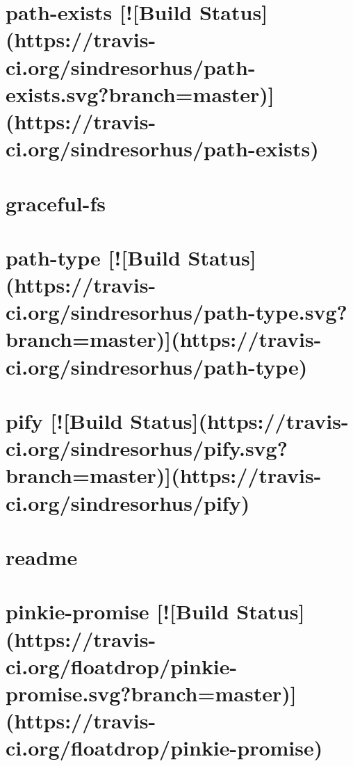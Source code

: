 \documentclass[twoside]{book}
\newcommand{\+}{\discretionary{\mbox{\scriptsize$\hookleftarrow$}}{}{}}
\begin{document}
\chapter{path-\/exists \mbox{[}!\mbox{[}Build Status\mbox{]}(https\+://travis-\/ci.org/sindresorhus/path-\/exists.svg?branch=master)\mbox{]}(https\+://travis-\/ci.org/sindresorhus/path-\/exists)}
\label{md_app_web_node_modules_path-exists_readme}

\chapter{graceful-\/fs}
\label{md_app_web_node_modules_path-type_node_modules_graceful-fs__r_e_a_d_m_e}

\chapter{path-\/type \mbox{[}!\mbox{[}Build Status\mbox{]}(https\+://travis-\/ci.org/sindresorhus/path-\/type.svg?branch=master)\mbox{]}(https\+://travis-\/ci.org/sindresorhus/path-\/type)}
\label{md_app_web_node_modules_path-type_readme}

\chapter{pify \mbox{[}!\mbox{[}Build Status\mbox{]}(https\+://travis-\/ci.org/sindresorhus/pify.svg?branch=master)\mbox{]}(https\+://travis-\/ci.org/sindresorhus/pify)}
\label{md_app_web_node_modules_pify_readme}

\chapter{readme}
\label{md_app_web_node_modules_pinkie_readme}

\chapter{pinkie-\/promise \mbox{[}!\mbox{[}Build Status\mbox{]}(https\+://travis-\/ci.org/floatdrop/pinkie-\/promise.svg?branch=master)\mbox{]}(https\+://travis-\/ci.org/floatdrop/pinkie-\/promise)}
\label{md_app_web_node_modules_pinkie-promise_readme}

\end{document}
